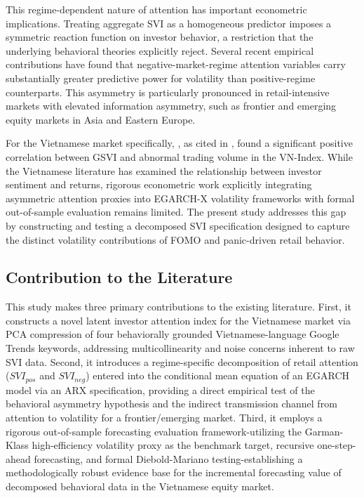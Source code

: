 \documentclass[12pt, a4paper]{article}
\begin{document}
This regime-dependent nature of attention has important econometric implications. Treating aggregate SVI as a homogeneous predictor imposes a symmetric reaction function on investor behavior, a restriction that the underlying behavioral theories explicitly reject. Several recent empirical contributions have found that negative-market-regime attention variables carry substantially greater predictive power for volatility than positive-regime counterparts. This asymmetry is particularly pronounced in retail-intensive markets with elevated information asymmetry, such as frontier and emerging equity markets in Asia and Eastern Europe.

For the Vietnamese market specifically, \citet{nguyen2020}, as cited in \citet{ayala2024}, found a significant positive correlation between GSVI and abnormal trading volume in the VN-Index. While the Vietnamese literature has examined the relationship between investor sentiment and returns, rigorous econometric work explicitly integrating asymmetric attention proxies into EGARCH-X volatility frameworks with formal out-of-sample evaluation remains limited. The present study addresses this gap by constructing and testing a decomposed SVI specification designed to capture the distinct volatility contributions of FOMO and panic-driven retail behavior.

\subsection{Contribution to the Literature}

This study makes three primary contributions to the existing literature. First, it constructs a novel latent investor attention index for the Vietnamese market via PCA compression of four behaviorally grounded Vietnamese-language Google Trends keywords, addressing multicollinearity and noise concerns inherent to raw SVI data. Second, it introduces a regime-specific decomposition of retail attention ($SVI_{pos}$ and $SVI_{neg}$) entered into the conditional mean equation of an EGARCH model via an ARX specification, providing a direct empirical test of the behavioral asymmetry hypothesis and the indirect transmission channel from attention to volatility for a frontier/emerging market. Third, it employs a rigorous out-of-sample forecasting evaluation framework-utilizing the Garman-Klass high-efficiency volatility proxy as the benchmark target, recursive one-step-ahead forecasting, and formal Diebold-Mariano testing-establishing a methodologically robust evidence base for the incremental forecasting value of decomposed behavioral data in the Vietnamese equity market.
\end{document}
